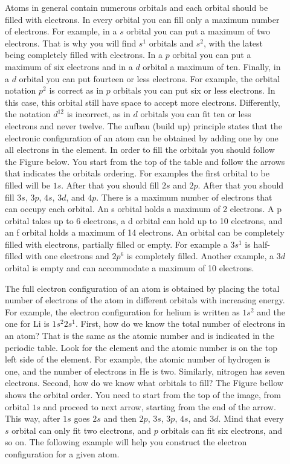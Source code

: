 \documentclass[main.tex]{subfiles}
\begin{document}
\begin{description}
\item[] 
Atoms in general contain numerous orbitals and each orbital should be filled with electrons. In every orbital you can fill only a maximum number of electrons. For example, in a $s$ orbital you can put a maximum of two electrons. That is why you will find $s^1$ orbitals and $s^2$, with the latest being completely filled with electrons. In a $p$ orbital you can put a maximum of six electrons and in a $d$ orbital a maximum of ten. Finally, in a $d$ orbital you can put fourteen or less electrons. For example, the orbital notation $p^2$ is correct as in $p$ orbitals you can put six or less electrons. In this case, this orbital still have space to accept more electrons. Differently, the notation $d^{12}$ is incorrect, as in $d$ orbitals you can fit ten or less electrons and never twelve. The aufbau (build up) principle states that the electronic configuration of an atom can be obtained by adding one by one all electrons in the element.
In order to fill the orbitals you should follow the Figure below. You start from the top of the table and follow the arrows that indicates the orbitals ordering. For examples the first orbital to be filled will be $1s$. After that you should fill  $2s$ and  $2p$. After that you should fill $3s$, $3p$, $4s$, $3d$, and $4p$. There is a maximum number of electrons that can occupy each orbital. An s orbital holds a maximum of 2 electrons. A p orbital takes up to 6 electrons, a d orbital can hold up to 10 electrons, and an f orbital holds a maximum of 14 electrons. An orbital can be completely filled with electrons, partially filled or empty. For example a $3s^1$ is half-filled with one electrons and $2p^6$ is completely filled. Another example, a $3d$ orbital is empty and can accommodate a maximum of 10 electrons.
\item[] The full electron configuration of an atom is obtained by placing the total number of electrons of the atom in different orbitals with increasing energy. For example, the electron configuration for helium is written as $1s^2$ and the one for Li is $1s^2 2s^1$.  First, how do we know the total number of electrons in an atom? That is the same as the atomic number and is indicated in the periodic table. Look for the element and the atomic number is on the top left side of the element. For example, the atomic number of hydrogen is one, and the number of electrons in He is two. Similarly, nitrogen has seven electrons. Second, how do we know what orbitals to fill? The Figure bellow shows the orbital order. You need to start from the top of the image, from orbital $1s$ and proceed to next arrow, starting from the end of the arrow. This way, after $1s$ goes $2s$ and then $2p$, $3s$, $3p$, $4s$, and $3d$. Mind that every $s$ orbital can only fit two electrons, and $p$ orbitals can fit six electrons, and so on. The following example will help you construct the electron configuration for a given atom.





\end{description}
\end{document}

